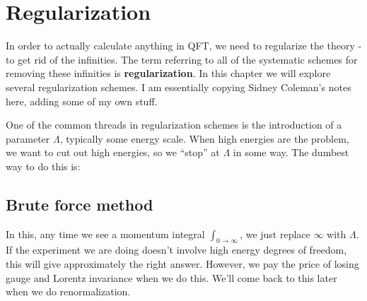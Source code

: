 \documentclass[main.tex]{subfiles}
\begin{document}
\chapter{Regularization}
In order to actually calculate anything in QFT, we need to regularize the theory - to get rid of the infinities. The term referring to all of the systematic schemes for removing these infinities is \textbf{regularization}. In this chapter we will explore several regularization schemes. I am essentially copying Sidney Coleman's notes here, adding some of my own stuff.

One of the common threads in regularization schemes is the introduction of a parameter $\Lambda$, typically some energy scale. When high energies are the problem, we want to cut out high energies, so we ``stop'' at $\Lambda$ in some way. The dumbest way to do this is:

\section{Brute force method}
In this, any time we see a momentum integral $\int_{0 \to \infty}$, we just replace $\infty$ with $\Lambda$. If the experiment we are doing doesn't involve high energy degrees of freedom, this will give approximately the right answer. However, we pay the price of losing gauge and Lorentz invariance when we do this. We'll come back to this later when we do renormalization.
\end{document}
